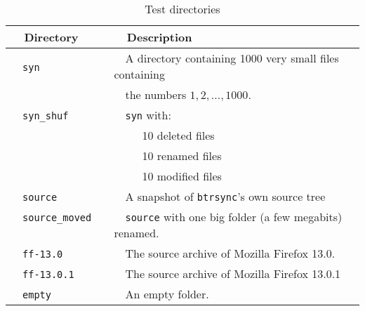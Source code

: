 \documentclass{llncs}
\newcommand{\btrsync}{\texttt{btrsync}\xspace}
\begin{document}



%

\begin{table}
\centering
  \caption{Test directories}
  \label{tab:benchdirec}
\begin{tabular}{ll}\toprule
~~{\bf Directory}              ~~&~~{\bf Description}\\\midrule
~~{\tt syn}              ~~&~~A directory containing 1000 very small files containing~~\\
~~                             ~~&~~the numbers $1,2,\ldots,1000$. \\
~~{\tt syn\_shuf}    ~~&~~{\tt syn} with:\\
                             ~~& ~~~~~10 deleted files\\
                             ~~& ~~~~~10 renamed files \\
                             ~~& ~~~~~10 modified files \\
~~{\tt source}                 ~~& ~~A snapshot of \btrsync's own source tree \\
~~{\tt source\_moved}          ~~& ~~{\tt source} with one big folder (a few megabits) renamed.~~\\
~~{\tt ff-13.0}           ~~& ~~The source archive of Mozilla Firefox 13.0.\\
~~{\tt ff-13.0.1}         ~~& ~~The source archive of Mozilla Firefox 13.0.1\\
~~{\tt empty}                  ~~& ~~An empty folder.\\\bottomrule
\end{tabular}\smallskip
\end{table}
\end{document}
